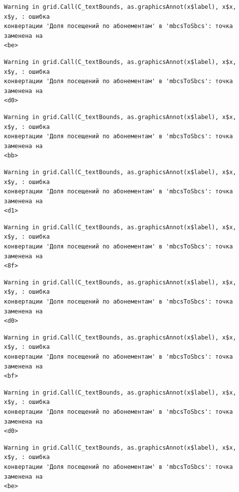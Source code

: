 \documentclass[
  letterpaper,
  DIV=11,
  numbers=noendperiod]{scrreprt}
\begin{document}
\begin{verbatim}
Warning in grid.Call(C_textBounds, as.graphicsAnnot(x$label), x$x, x$y, : ошибка
конвертации 'Доля посещений по абонементам' в 'mbcsToSbcs': точка заменена на
<be>
\end{verbatim}

\begin{verbatim}
Warning in grid.Call(C_textBounds, as.graphicsAnnot(x$label), x$x, x$y, : ошибка
конвертации 'Доля посещений по абонементам' в 'mbcsToSbcs': точка заменена на
<d0>
\end{verbatim}

\begin{verbatim}
Warning in grid.Call(C_textBounds, as.graphicsAnnot(x$label), x$x, x$y, : ошибка
конвертации 'Доля посещений по абонементам' в 'mbcsToSbcs': точка заменена на
<bb>
\end{verbatim}

\begin{verbatim}
Warning in grid.Call(C_textBounds, as.graphicsAnnot(x$label), x$x, x$y, : ошибка
конвертации 'Доля посещений по абонементам' в 'mbcsToSbcs': точка заменена на
<d1>
\end{verbatim}

\begin{verbatim}
Warning in grid.Call(C_textBounds, as.graphicsAnnot(x$label), x$x, x$y, : ошибка
конвертации 'Доля посещений по абонементам' в 'mbcsToSbcs': точка заменена на
<8f>
\end{verbatim}

\begin{verbatim}
Warning in grid.Call(C_textBounds, as.graphicsAnnot(x$label), x$x, x$y, : ошибка
конвертации 'Доля посещений по абонементам' в 'mbcsToSbcs': точка заменена на
<d0>
\end{verbatim}

\begin{verbatim}
Warning in grid.Call(C_textBounds, as.graphicsAnnot(x$label), x$x, x$y, : ошибка
конвертации 'Доля посещений по абонементам' в 'mbcsToSbcs': точка заменена на
<bf>
\end{verbatim}

\begin{verbatim}
Warning in grid.Call(C_textBounds, as.graphicsAnnot(x$label), x$x, x$y, : ошибка
конвертации 'Доля посещений по абонементам' в 'mbcsToSbcs': точка заменена на
<d0>
\end{verbatim}

\begin{verbatim}
Warning in grid.Call(C_textBounds, as.graphicsAnnot(x$label), x$x, x$y, : ошибка
конвертации 'Доля посещений по абонементам' в 'mbcsToSbcs': точка заменена на
<be>
\end{verbatim}
\end{document}
